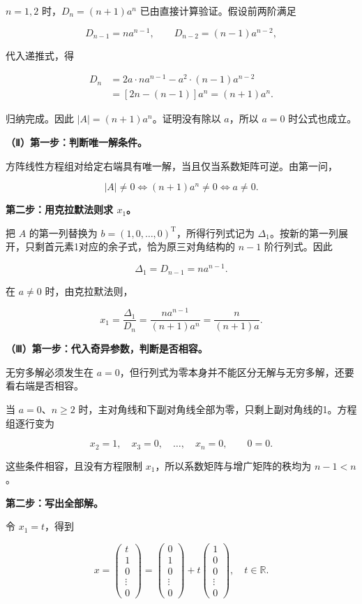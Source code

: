 \documentclass[UTF8,11pt,fontset=windows]{ctexart}
\begin{document}
$n=1,2$ 时，$D_n=(n+1)a^n$ 已由直接计算验证。假设前两阶满足

$$
D_{n-1}=na^{n-1},\qquad D_{n-2}=(n-1)a^{n-2},
$$

代入递推式，得

$$
\begin{aligned}
D_n&=2a\cdot na^{n-1}-a^2\cdot(n-1)a^{n-2}\\
&=[2n-(n-1)]a^n=(n+1)a^n.
\end{aligned}
$$

归纳完成。因此 $\boxed{|A|=(n+1)a^n}$。证明没有除以 $a$，所以 $a=0$ 时公式也成立。

\textbf{（Ⅱ）第一步：判断唯一解条件。}

方阵线性方程组对给定右端具有唯一解，当且仅当系数矩阵可逆。由第一问，

$$
|A|\ne0\Longleftrightarrow(n+1)a^n\ne0
\Longleftrightarrow\boxed{a\ne0}.
$$

\textbf{第二步：用克拉默法则求 $x_1$。}

把 $A$ 的第一列替换为 $b=(1,0,\ldots,0)^{\mathrm T}$，所得行列式记为 $\Delta_1$。按新的第一列展开，只剩首元素1对应的余子式，恰为原三对角结构的 $n-1$ 阶行列式。因此

$$
\Delta_1=D_{n-1}=na^{n-1}.
$$

在 $a\ne0$ 时，由克拉默法则，

$$
\boxed{x_1=\frac{\Delta_1}{D_n}
=\frac{na^{n-1}}{(n+1)a^n}
=\frac{n}{(n+1)a}}.
$$

\textbf{（Ⅲ）第一步：代入奇异参数，判断是否相容。}

无穷多解必须发生在 $a=0$，但行列式为零本身并不能区分无解与无穷多解，还要看右端是否相容。

当 $a=0$、$n\ge2$ 时，主对角线和下副对角线全部为零，只剩上副对角线的1。方程组逐行变为

$$
x_2=1,\quad x_3=0,\quad\ldots,\quad x_n=0,
\qquad 0=0.
$$

这些条件相容，且没有方程限制 $x_1$，所以系数矩阵与增广矩阵的秩均为 $n-1<n$。

\textbf{第二步：写出全部解。}

令 $x_1=t$，得到

$$
\boxed{x=\begin{pmatrix}t\\1\\0\\\vdots\\0\end{pmatrix}
=\begin{pmatrix}0\\1\\0\\\vdots\\0\end{pmatrix}
+t\begin{pmatrix}1\\0\\0\\\vdots\\0\end{pmatrix},
\quad t\in\mathbb R.}
$$
\end{document}
